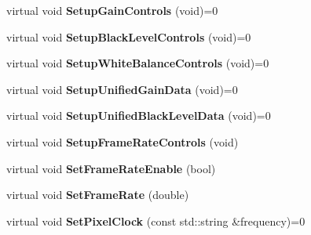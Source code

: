 \begin{DoxyCompactItemize}
\item 
\hypertarget{class_wizard_quick_setup_a32e7531a8e8f95c67fa756eb489c7765}{virtual void {\bfseries Setup\+Gain\+Controls} (void)=0}\label{class_wizard_quick_setup_a32e7531a8e8f95c67fa756eb489c7765}

\item 
\hypertarget{class_wizard_quick_setup_ab3a687b1ea2bc81a6b05fef8546fc116}{virtual void {\bfseries Setup\+Black\+Level\+Controls} (void)=0}\label{class_wizard_quick_setup_ab3a687b1ea2bc81a6b05fef8546fc116}

\item 
\hypertarget{class_wizard_quick_setup_a9a1e50d4602fac7c71906ff7d6141a7e}{virtual void {\bfseries Setup\+White\+Balance\+Controls} (void)=0}\label{class_wizard_quick_setup_a9a1e50d4602fac7c71906ff7d6141a7e}

\item 
\hypertarget{class_wizard_quick_setup_ae136dff924c545d8fef11a2bd62b53a7}{virtual void {\bfseries Setup\+Unified\+Gain\+Data} (void)=0}\label{class_wizard_quick_setup_ae136dff924c545d8fef11a2bd62b53a7}

\item 
\hypertarget{class_wizard_quick_setup_aaaca38d10dc4fd1dc0634a359f5f9486}{virtual void {\bfseries Setup\+Unified\+Black\+Level\+Data} (void)=0}\label{class_wizard_quick_setup_aaaca38d10dc4fd1dc0634a359f5f9486}

\item 
\hypertarget{class_wizard_quick_setup_a20ece3f25825baadd01278f0807c9b3e}{virtual void {\bfseries Setup\+Frame\+Rate\+Controls} (void)}\label{class_wizard_quick_setup_a20ece3f25825baadd01278f0807c9b3e}

\item 
\hypertarget{class_wizard_quick_setup_a421811af5fa9f8e62c0a110277b23d6e}{virtual void {\bfseries Set\+Frame\+Rate\+Enable} (bool)}\label{class_wizard_quick_setup_a421811af5fa9f8e62c0a110277b23d6e}

\item 
\hypertarget{class_wizard_quick_setup_af42e18daef9f45fd662b28986af5740e}{virtual void {\bfseries Set\+Frame\+Rate} (double)}\label{class_wizard_quick_setup_af42e18daef9f45fd662b28986af5740e}

\item 
\hypertarget{class_wizard_quick_setup_a8a4434446cdf6a4c9e4433502b057038}{virtual void {\bfseries Set\+Pixel\+Clock} (const std\+::string \&frequency)=0}\label{class_wizard_quick_setup_a8a4434446cdf6a4c9e4433502b057038}


\end{DoxyCompactItemize}
